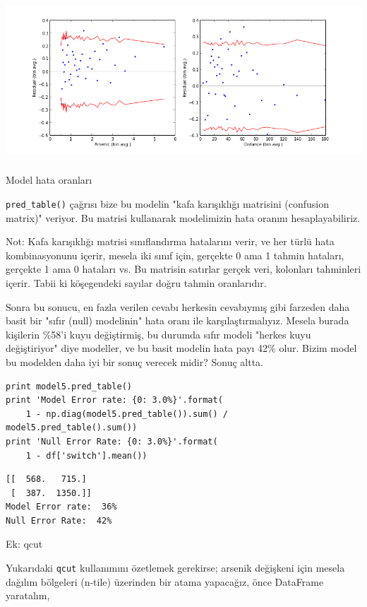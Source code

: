 \documentclass[12pt,fleqn]{article}\usepackage{../../common}
\begin{document}
\includegraphics[height=6cm]{stat_logit_09.png}

Model hata oranları

\verb!pred_table()! çağrısı bize bu modelin "kafa karışıklığı matrisini
(confusion matrix)" veriyor. Bu matrisi kullanarak modelimizin hata oranını
hesaplayabiliriz.

Not: Kafa karışıklığı matrisi sınıflandırma hatalarını verir, ve her türlü hata
kombinasyonunu içerir, mesela iki sınıf için, gerçekte 0 ama 1 tahmin hataları,
gerçekte 1 ama 0 hataları vs. Bu matrisin satırlar gerçek veri, kolonları
tahminleri içerir. Tabii ki köşegendeki sayılar doğru tahmin oranlarıdır.

Sonra bu sonucu, en fazla verilen cevabı herkesin cevabıymış gibi farzeden daha
basit bir "sıfır (null) modelinin" hata oranı ile karşılaştırmalıyız. Mesela
burada kişilerin \%58'i kuyu değiştirmiş, bu durumda sıfır modeli "herkes kuyu
değiştiriyor" diye modeller, ve bu basit modelin hata payı 42\% olur. Bizim
model bu modelden daha iyi bir sonuç verecek midir? Sonuç altta.

\begin{verbatim}
print model5.pred_table()
print 'Model Error rate: {0: 3.0%}'.format(
    1 - np.diag(model5.pred_table()).sum() / model5.pred_table().sum())
print 'Null Error Rate: {0: 3.0%}'.format(
    1 - df['switch'].mean())
\end{verbatim}

\begin{verbatim}
[[  568.   715.]
 [  387.  1350.]]
Model Error rate:  36%
Null Error Rate:  42%
\end{verbatim}

Ek: qcut

Yukarıdaki \verb!qcut! kullanımını özetlemek gerekirse; arsenik değişkeni için
mesela dağılım bölgeleri (n-tile) üzerinden bir atama yapacağız, önce DataFrame
yaratalım,
\end{document}
